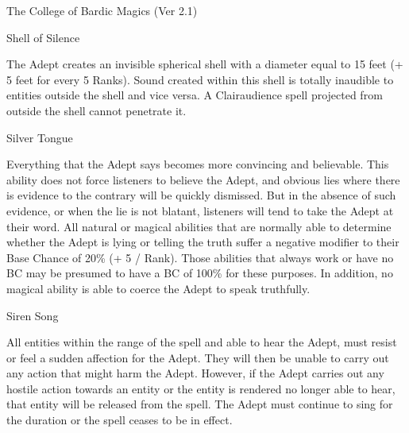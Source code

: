 \begin{Chapter}{The College of Bardic Magics (Ver 2.1)}
\begin{spell}[S-10]{Shell of Silence}

\begin{effects}
The Adept creates an invisible spherical shell with a diameter equal
to 15 feet (+ 5 feet for every 5 Ranks).  Sound created within this
shell is totally inaudible to entities outside the shell and vice
versa.  A Clairaudience spell projected from outside the shell cannot
penetrate it.
\end{effects}
\end{spell}

\begin{spell}[S-11]{Silver Tongue}

\begin{effects}
Everything that the Adept says becomes more convincing and believable.
This ability does not force listeners to believe the Adept, and
obvious lies where there is evidence to the contrary will be quickly
dismissed.  But in the absence of such evidence, or when the lie is
not blatant, listeners will tend to take the Adept at their word. All
natural or magical abilities that are normally able to determine
whether the Adept is lying or telling the truth suffer a negative
modifier to their Base Chance of 20\% (+ 5 / Rank).  Those abilities
that always work or have no BC may be presumed to have a BC of 100\%
for these purposes. In addition, no magical ability is able to coerce
the Adept to speak truthfully.
\end{effects}
\end{spell}

\begin{spell}[S-12]{Siren Song}

\begin{effects}
All entities within the range of the spell and able to hear the Adept,
must resist or feel a sudden affection for the Adept.  They will then
be unable to carry out any action that might harm the Adept. However,
if the Adept carries out any hostile action towards an entity or the
entity is rendered no longer able to hear, that entity will be
released from the spell.  The Adept must continue to sing for the
duration or the spell ceases to be in effect.
\end{effects}
\end{spell}


\end{Chapter}
